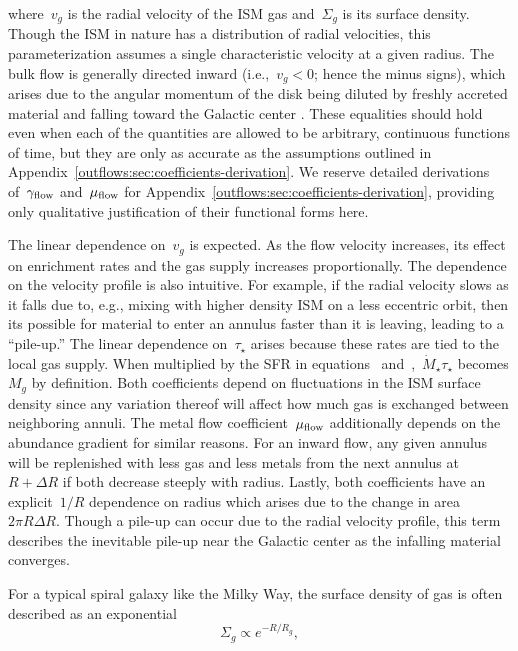 where~$v_g$ is the radial velocity of the ISM gas and~$\Sigma_g$ is its surface
density.
Though the ISM in nature has a distribution of radial velocities, this
parameterization assumes a single characteristic velocity at a given radius.
The bulk flow is generally directed inward (i.e.,~$v_g < 0$; hence the minus
signs), which arises due to the angular momentum of the disk being diluted by
freshly accreted material and falling toward the Galactic center
\citep[see discussion in, e.g.,][]{Bilitewski2012}.
These equalities should hold even when each of the quantities are allowed to be
arbitrary, continuous functions of time, but they are only as accurate as the
assumptions outlined in Appendix~\ref{outflows:sec:coefficients-derivation}.
We reserve detailed derivations of~$\gamma_{\text{flow}}$ and~$\mu_{\text{flow}}$ for
Appendix~\ref{outflows:sec:coefficients-derivation}, providing only
qualitative justification of their functional forms here.
\par
The linear dependence on~$v_g$ is expected.
As the flow velocity increases, its effect on enrichment rates and the gas
supply increases proportionally.
The dependence on the velocity profile is also intuitive.
For example, if the radial velocity slows as it falls due to, e.g., mixing with
higher density ISM on a less eccentric orbit, then its possible for material to
enter an annulus faster than it is leaving, leading to a ``pile-up.''
The linear dependence on~$\tau_\star$ arises because these rates are tied to
the local gas supply.
When multiplied by the SFR in equations~
and~,~$\dot{M}_\star \tau_\star$ becomes
$M_g$ by definition.
Both coefficients depend on fluctuations in the ISM surface density since any
variation thereof will affect how much gas is exchanged between neighboring
annuli.
The metal flow coefficient~$\mu_{\text{flow}}$ additionally depends on the abundance
gradient for similar reasons.
For an inward flow, any given annulus will be replenished with less gas and
less metals from the next annulus at~$R + \Delta R$ if both decrease steeply
with radius.
Lastly, both coefficients have an explicit~$1 / R$ dependence on radius which
arises due to the change in area~$2 \pi R \Delta R$.
Though a pile-up can occur due to the radial velocity profile, this term
describes the inevitable pile-up near the Galactic center as the infalling
material converges.
\par
For a typical spiral galaxy like the Milky Way, the surface density of gas is
often described as an exponential
\begin{equation}
\Sigma_g \propto e^{-R / R_g},
\end{equation}
